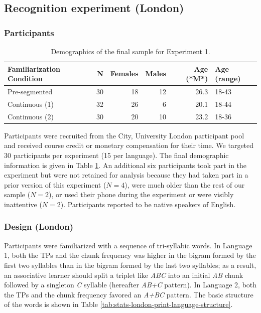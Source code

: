 \documentclass[
]{article}
\begin{document}
\hypertarget{recognition-experiment-london}{%
\subsection{Recognition experiment
(London)}\label{recognition-experiment-london}}

\hypertarget{participants-1}{%
\subsubsection{Participants}\label{participants-1}}

\begin{table}

\caption{\label{tab:stats-london-demographics-print}Demographics of the final sample for Experiment 1.}
\centering
\begin{tabular}[t]{lrrrrl}
\toprule
Familiarization Condition & N & Females & Males & Age (*M*) & Age (range)\\
\midrule
Pre-segmented & 30 & 18 & 12 & 26.3 & 18-43\\
Continuous (1) & 32 & 26 & 6 & 20.1 & 18-44\\
Continuous (2) & 30 & 20 & 10 & 23.2 & 18-36\\
\bottomrule
\end{tabular}
\end{table}

Participants were recruited from the City, University London participant
pool and received course credit or monetary compensation for their time.
We targeted 30 participants per experiment (15 per language). The final
demographic information is given in Table
\ref{tab:stats-london-demographics-print}. An additional six
participants took part in the experiment but were not retained for
analysis because they had taken part in a prior version of this
experiment (\(N = 4\)), were much older than the rest of our sample
(\(N = 2\)), or used their phone during the experiment or were visibly
inattentive (\(N = 2\)). Participants reported to be native speakers of
English.

\hypertarget{design-london}{%
\subsubsection{Design (London)}\label{design-london}}

Participants were familiarized with a sequence of tri-syllabic words. In
Language 1, both the TPs and the chunk frequency was higher in the
bigram formed by the first two syllables than in the bigram formed by
the last two syllables; as a result, an associative learner should split
a triplet like \emph{ABC} into an initial \emph{AB} chunk followed by a
singleton \emph{C} syllable (hereafter \emph{AB+C} pattern). In Language
2, both the TPs and the chunk frequency favored an \emph{A+BC} pattern.
The basic structure of the words is shown in Table
\ref{tab:stats-london-print-language-structure}.
\end{document}
